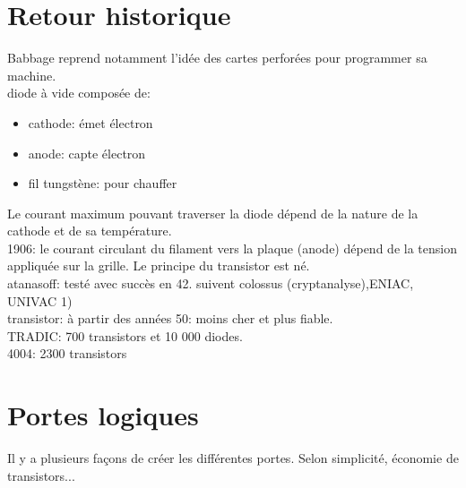 \documentclass[a4paper,11pt]{article}
\begin{document}
\begin{Form}
\section*{Retour historique}
\begin{commentprof}
Babbage reprend notamment l'idée des cartes perforées pour programmer sa machine.\\diode à vide composée de:
\begin{itemize}
\item cathode: émet électron
\item anode: capte électron
\item fil tungstène: pour chauffer
\end{itemize}
Le courant maximum pouvant traverser la diode dépend de la nature de la cathode et de sa température.\\1906: le courant circulant du filament vers la plaque (anode) dépend de la tension appliquée sur la grille. Le principe du transistor est né.\\atanasoff: testé avec succès en 42. suivent colossus (cryptanalyse),ENIAC, UNIVAC 1)\\transistor: à partir des années 50: moins cher et plus fiable.\\TRADIC: 700 transistors et 10 000 diodes.\\4004: 2300 transistors 
\end{commentprof}
\section{Portes logiques}
\begin{commentprof}
Il y a plusieurs façons de créer les différentes portes. Selon simplicité, économie de transistors...
\end{commentprof}

\end{Form}
\end{document}

